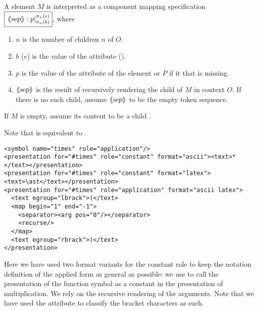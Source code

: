 A {} element $M$ is interpreted as a component mapping
specification $\fbox{\ensuremath{\left.\langle\kern-.25em\langle\hbox{\sl{sep}}\rangle\kern-.25em\rangle:p\right|_{\pi_n(b)}^{\pi_n(e)}}}$, where
\begin{enumerate}
\item $n$ is the number of children $n$ of $O$.
\item $b$ ($e$) is the value of the attribute {}
  ({}). 
\item $p$ is the value of the {} attribute of the
  {} element or $P$ if it that is missing.
\item $\langle\kern-.25em\langle\hbox{\sl{sep}}\rangle\kern-.25em\rangle$ is the result of recursively rendering the {}
  child of $M$ in context $O$. If there is no such child, assume $\langle\kern-.25em\langle\hbox{\sl{sep}}\rangle\kern-.25em\rangle$ to be the
  empty token sequence.
\end{enumerate}
If $M$ is empty, assume its content to be a child {}.

Note that {} is
equivalent to {}.

\begin{lstlisting}[mathescape,label={lst:multiplication},
                   caption={A Notation Definition for Multiplication}]
<symbol name="times" role="application"/>
<presentation for="#times" role="constant" format="ascii"><text>*</text></presentation>
<presentation for="#times" role="constant" format="latex"><text>\ast</text></presentation>
<presentation for="#times" role="application" format="ascii latex">
  <text egroup="lbrack">(</text>
  <map begin="1" end="-1">
    <separator><arg pos="0"/></separator>
    <recurse/>
  </map>
  <text egroup="rbrack">)</text>
</presentation>
\end{lstlisting}
Here we have used two format variants for the constant role to keep the notation
definition of the applied form as general as possible: we use {}
to call the presentation of the function symbol as a constant in the presentation of
multiplication. We rely on the recursive rendering of the arguments. Note that we have
used the {} attribute to classify the bracket characters as
such.

